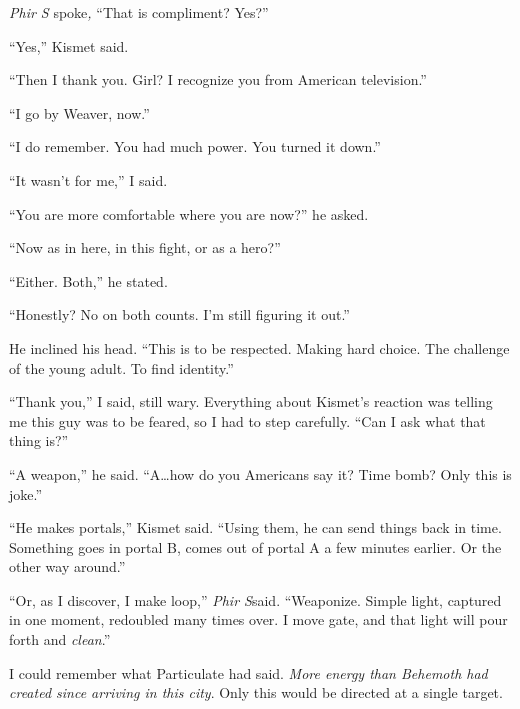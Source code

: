 \emph{Phir S} spoke\emph{, }``That is compliment?  Yes?''



``Yes,'' Kismet said.



``Then I thank you.  Girl?  I recognize you from American television.''



``I go by Weaver, now.''



``I do remember.  You had much power.  You turned it down.''



``It wasn't for me,'' I said.



``You are more comfortable where you are now?'' he asked.



``Now as in here, in this fight, or as a hero?''



``Either.  Both,'' he stated.



``Honestly?  No on both counts.  I'm still figuring it out.''



He inclined his head.  ``This is to be respected.  Making hard choice.  The challenge of the young adult.  To find identity.''



``Thank you,'' I said, still wary.  Everything about Kismet's reaction was telling me this guy was to be feared, so I had to step carefully.  ``Can I ask what that thing is?''



``A weapon,'' he said.  ``A\ldots how do you Americans say it?  Time bomb?  Only this is joke.''



``He makes portals,'' Kismet said.  ``Using them, he can send things back in time.  Something goes in portal B, comes out of portal A a few minutes earlier.  Or the other way around.''



``Or, as I discover, I make loop,'' \emph{Phir S}said.  ``Weaponize.  Simple light, captured in one moment, redoubled many times over.  I move gate, and that light will pour forth and\emph{ clean}.''



I could remember what Particulate had said.  \emph{More energy than Behemoth had created since arriving in this city}.  Only this would be directed at a single target.



